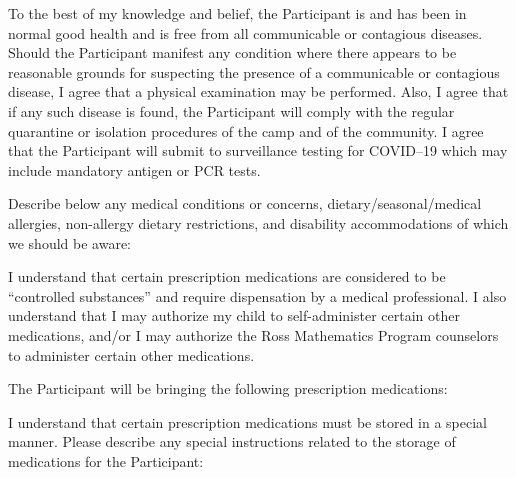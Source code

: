 \documentclass{ross}
\begin{document}
To the best of my knowledge and belief, the Participant is and has
been in normal good health and is free from all communicable or
contagious diseases. Should the Participant manifest any condition
where there appears to be reasonable grounds for suspecting the
presence of a communicable or contagious disease, I agree that a
physical examination may be performed. Also, I agree that if any such
disease is found, the Participant will comply with the regular
quarantine or isolation procedures of the camp and of the community.
I agree that the Participant will submit to surveillance testing for
COVID--19 which may include mandatory antigen or PCR tests.

Describe below any medical conditions or concerns,
dietary/seasonal/medical allergies, non-allergy dietary restrictions,
and disability accommodations of which we should be aware:

\begin{tcolorbox}[enhanced,overlay unbroken and first={
  \node[anchor=north,inner sep=1pt] at (frame.south) {\scriptsize\color{gray} medical conditions};
  }]
  \vspace{1in}
\end{tcolorbox}

I understand that certain prescription medications are considered to
be ``controlled substances'' and require dispensation by a medical
professional. I also understand that I may authorize my child to
self-administer certain other medications, and/or I may authorize the
Ross Mathematics Program counselors to administer certain other
medications.

The Participant will be bringing the following prescription medications:

\begin{tcolorbox}[enhanced,overlay unbroken and first={
  \node[anchor=north,inner sep=1pt] at (frame.south) {\scriptsize\color{gray} prescription medications};
  }]
  \vspace{1in}
\end{tcolorbox}

I understand that certain prescription medications must be stored in a special manner. Please describe any special instructions related to the storage of medications for the Participant:

\begin{tcolorbox}[enhanced,overlay unbroken and first={
  \node[anchor=north,inner sep=1pt] at (frame.south) {\scriptsize\color{gray} special instructions};
  }]
  \vspace{1in}
\end{tcolorbox}
\end{document}

